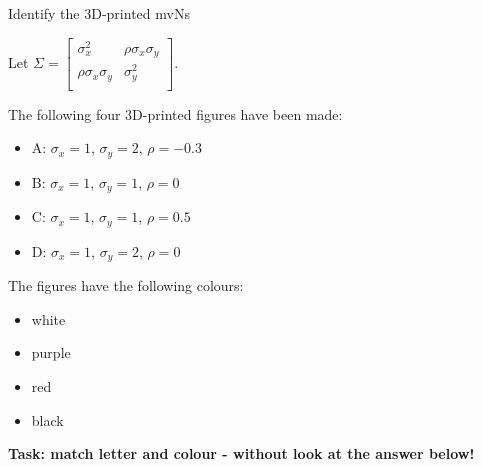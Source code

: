 \documentclass[ignorenonframetext,]{beamer}
\providecommand{\tightlist}{%
  \setlength{\itemsep}{0pt}\setlength{\parskip}{0pt}}
\begin{document}
\begin{frame}

\begin{block}{Identify the 3D-printed mvNs}

Let
\(\Sigma=\left[\begin{array}{cc} \sigma_x^2 & \rho\sigma_{x}\sigma_{y}\\\rho\sigma_{x}\sigma_{y}&\sigma_y^2\\ \end{array} \right]\).

The following four 3D-printed figures have been made:

\begin{itemize}
\tightlist
\item
  A: \(\sigma_x=1\), \(\sigma_y=2\), \(\rho=-0.3\)
\item
  B: \(\sigma_x=1\), \(\sigma_y=1\), \(\rho=0\)
\item
  C: \(\sigma_x=1\), \(\sigma_y=1\), \(\rho=0.5\)
\item
  D: \(\sigma_x=1\), \(\sigma_y=2\), \(\rho=0\)
\end{itemize}

The figures have the following colours:

\begin{itemize}
\tightlist
\item
  white
\item
  purple
\item
  red
\item
  black
\end{itemize}

\textbf{Task: match letter and colour - without look at the answer
below!}

\end{block}

\end{frame}
\end{document}
